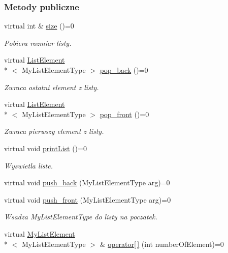 \subsubsection*{Metody publiczne}
\begin{DoxyCompactItemize}
\item 
virtual int \& \hyperlink{class_list_ac769a9bcdfa13a032783bac75d8957bd}{size} ()=0
\begin{DoxyCompactList}\small\item\em Pobiera rozmiar listy. \end{DoxyCompactList}\item 
virtual \hyperlink{class_list_element}{List\-Element}\\*
$<$ My\-List\-Element\-Type $>$ \hyperlink{class_list_a2e7dc3322b64d7fd29850efdd7c2697e}{pop\-\_\-back} ()=0
\begin{DoxyCompactList}\small\item\em Zwraca ostatni element z listy. \end{DoxyCompactList}\item 
virtual \hyperlink{class_list_element}{List\-Element}\\*
$<$ My\-List\-Element\-Type $>$ \hyperlink{class_list_ae8ae20b4a199d5d44a8119e49d6f50a4}{pop\-\_\-front} ()=0
\begin{DoxyCompactList}\small\item\em Zwraca pierwszy element z listy. \end{DoxyCompactList}\item 
virtual void \hyperlink{class_list_acfa94dc35be53ea0d7e5d4671e40dabc}{print\-List} ()=0
\begin{DoxyCompactList}\small\item\em Wyswietla liste. \end{DoxyCompactList}\item 
virtual void \hyperlink{class_list_a54af4864ee34e03aefac902744d5831f}{push\-\_\-back} (My\-List\-Element\-Type arg)=0
\item 
virtual void \hyperlink{class_list_ab87c08aded4d34550abc5df48afef599}{push\-\_\-front} (My\-List\-Element\-Type arg)=0
\begin{DoxyCompactList}\small\item\em Wsadza My\-List\-Element\-Type do listy na poczatek. \end{DoxyCompactList}\item 
virtual \hyperlink{class_my_list_element}{My\-List\-Element}\\*
$<$ My\-List\-Element\-Type $>$ \& \hyperlink{class_list_aa1c32f16b6e5a7936364f5640dccfd44}{operator\mbox{[}$\,$\mbox{]}} (int number\-Of\-Element)=0

\end{DoxyCompactItemize}
